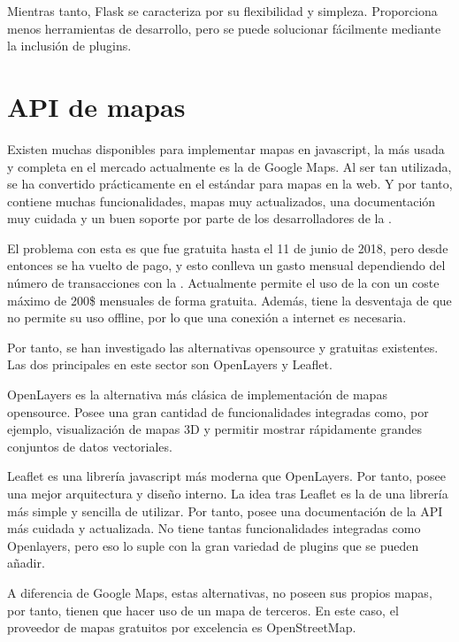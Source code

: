    Mientras tanto, Flask se caracteriza por su flexibilidad y simpleza. Proporciona menos herramientas de desarrollo, pero se puede solucionar fácilmente mediante la inclusión de plugins.
    
  
  \section{API de mapas}
  
    Existen muchas  disponibles para implementar mapas en javascript, la más usada y completa en el mercado actualmente es la de Google Maps\cite{gmaps}. Al ser tan utilizada, se ha convertido prácticamente en el estándar para mapas en la web. Y por tanto, contiene muchas funcionalidades, mapas muy actualizados, una documentación muy cuidada y un buen soporte por parte de los desarrolladores de la .
    
    El problema con esta  es que fue gratuita hasta el 11 de junio de 2018, pero desde entonces se ha vuelto de pago, y esto conlleva un gasto mensual dependiendo del número de transacciones con la . Actualmente permite el uso de la  con un coste máximo de 200\$ mensuales de forma gratuita. Además, tiene la desventaja de que no permite su uso offline, por lo que una conexión a internet es necesaria.

    
    Por tanto, se han investigado las alternativas opensource y gratuitas existentes. Las dos  principales en este sector son OpenLayers\cite{openlayers} y Leaflet\cite{leaflet}.
    
    OpenLayers es la alternativa más clásica de implementación de mapas opensource. Posee una gran cantidad de funcionalidades integradas como, por ejemplo, visualización de mapas 3D y permitir mostrar rápidamente grandes conjuntos de datos vectoriales.
    
    Leaflet es una librería javascript más moderna que OpenLayers. Por tanto, posee una mejor arquitectura y diseño interno. La idea tras Leaflet es la de una librería más simple y sencilla de utilizar. Por tanto, posee una documentación de la API más cuidada y actualizada. No tiene tantas funcionalidades integradas como Openlayers, pero eso lo suple con la gran variedad de plugins que se pueden añadir.
    
    A diferencia de Google Maps, estas alternativas, no poseen sus propios mapas, por tanto, tienen que hacer uso de un mapa de terceros. En este caso, el proveedor de mapas gratuitos por excelencia es OpenStreetMap\cite{osm}.
